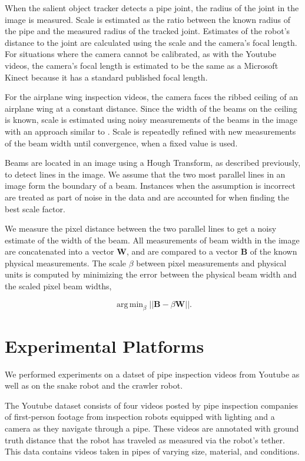 \documentclass[letterpaper, 10 pt, conference]{ieeeconf}
\DeclareMathOperator*{\argmin}{arg\,min}
\begin{document}
When the salient object tracker detects a pipe joint, the radius of the joint in the image is measured. Scale is estimated as the ratio between the known radius of the pipe and the measured radius of the tracked joint. Estimates of the robot's distance to the joint are calculated using the scale and the camera's focal length. For situations where the camera cannot be calibrated, as with the Youtube videos, the camera's focal length is estimated to be the same as a Microsoft Kinect because it has a standard published focal length.

For the airplane wing inspection videos, the camera faces the ribbed ceiling of an airplane wing at a constant distance. Since the width of the beams on the ceiling is known, scale is estimated using noisy measurements of the beams in the image with an approach similar to \cite{Lucey14}. Scale is repeatedly refined with new measurements of the beam width until convergence, when a fixed value is used.

Beams are located in an image using a Hough Transform, as described previously, to detect lines in the image. We assume that the two most parallel lines in an image form the boundary of a beam. Instances when the assumption is incorrect are treated as part of noise in the data and are accounted for when finding the best scale factor.

We measure the pixel distance between the two parallel lines to get a noisy estimate of the width of the beam. All measurements of beam width in the image are concatenated into a vector $\textbf{W}$, and are compared to a vector $\textbf{B}$ of the known physical measurements. The scale $\beta$ between pixel measurements and physical units is computed by minimizing the error between the physical beam width and the scaled pixel beam widths,

\begin{equation}
	\argmin_{\beta} ||\textbf{B} - \beta \textbf{W} ||.
\end{equation}


\section{Experimental Platforms} \label{section:Experimental Platforms}

We performed experiments on a datset of pipe inspection videos from Youtube as well as on the snake robot and the crawler robot.

The Youtube dataset consists of four videos \cite{pipevideo2, pipevideo4, pipevideo5, pipevideo6} posted by pipe inspection companies of first-person footage from inspection robots equipped with lighting and a camera as they navigate through a pipe. These videos are annotated with ground truth distance that the robot has traveled as measured via the robot's tether. This data contains videos taken in pipes of varying size, material, and conditions.
\end{document}
